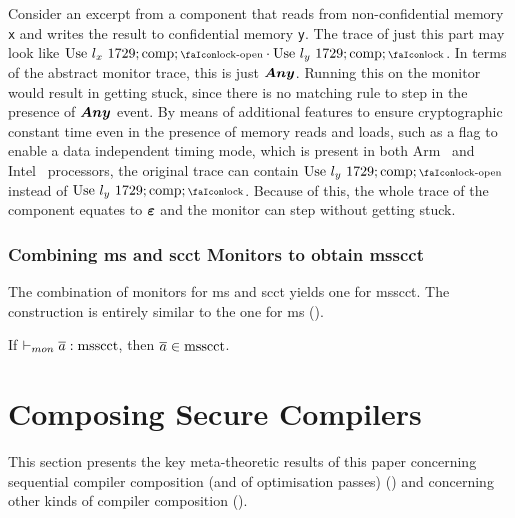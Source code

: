 \documentclass[utf8,acmsmall,review,screen,dvipsnames,anonymous]{acmart}
\begin{document}
\begin{example}
  Consider an excerpt from a component that reads from non-confidential memory \texttt{x} and writes the result to confidential memory \texttt{y}.
  The trace of just this part may look like $\ev{Use}\ \loc_{x}\ 1729;\comp;\unlock\cdot\ev{Use}\ \loc_{y}\ 1729;\comp;\lock$.
  In terms of the abstract monitor trace, this is just $\bm{Any}$.
  Running this on the monitor would result in getting stuck, since there is no matching rule to step in the presence of $\bm{Any}$ event. %
  By means of additional features to ensure cryptographic constant time even in the presence of memory reads and loads, such as a flag to enable a data independent timing mode, which is present in both Arm~\cite[p.~543]{arm-refman} and Intel~\cite[p.~80]{intel-refman} processors, the original trace can contain $\ev{Use}\ \loc_{y}\ 1729;\comp;\unlock$ instead of $\ev{Use}\ \loc_{y}\ 1729;\comp;\lock$.
  Because of this, the whole trace of the component equates to $\bm{\varepsilon}$ and the monitor can step without getting stuck.
\end{example}

\subsubsection{Combining \gls{ms} and \gls{scct} Monitors to obtain \gls{msscct}}

The combination of monitors for \gls{ms} and \gls{scct} yields one for \gls{msscct}.
The construction is entirely similar to the one for \gls{ms} ().

\begin{lemma}\label{lem:mon:msscctsafe}
  If $\vdash_{mon}{\overline{a}}:{\operatorname{msscct}}$, then $\overline{a}\in\operatorname{msscct}$. %
\end{lemma}

\section{Composing Secure Compilers}\label{sec:compcomp}

This section presents the key meta-theoretic results of this paper concerning sequential compiler composition (and of optimisation passes) () and concerning other kinds of compiler composition ().
\end{document}
